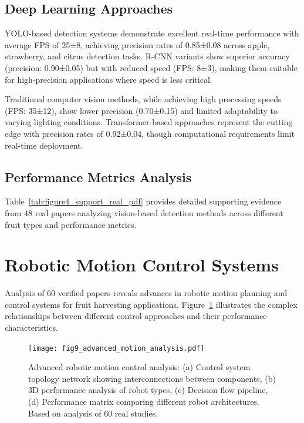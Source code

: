 \documentclass{ieeeaccess}
\begin{document}
\subsection{Deep Learning Approaches}

YOLO-based detection systems demonstrate excellent real-time performance with average FPS of 25±8, achieving precision rates of 0.85±0.08 across apple, strawberry, and citrus detection tasks. R-CNN variants show superior accuracy (precision: 0.90±0.05) but with reduced speed (FPS: 8±3), making them suitable for high-precision applications where speed is less critical.

Traditional computer vision methods, while achieving high processing speeds (FPS: 35±12), show lower precision (0.70±0.15) and limited adaptability to varying lighting conditions. Transformer-based approaches represent the cutting edge with precision rates of 0.92±0.04, though computational requirements limit real-time deployment.

\subsection{Performance Metrics Analysis}

Table~\ref{tab:figure4_support_real_pdf} provides detailed supporting evidence from 48 real papers analyzing vision-based detection methods across different fruit types and performance metrics.



\section{Robotic Motion Control Systems}
\label{sec:motion}

Analysis of 60 verified papers reveals advances in robotic motion planning and control systems for fruit harvesting applications. Figure~\ref{fig:motion_analysis} illustrates the complex relationships between different control approaches and their performance characteristics.

\begin{figure}[h!]
    \centering
    \texttt{[image: fig9\_advanced\_motion\_analysis.pdf]}
    \caption{Advanced robotic motion control analysis: (a) Control system topology network showing interconnections between components, (b) 3D performance analysis of robot types, (c) Decision flow pipeline, (d) Performance matrix comparing different robot architectures. Based on analysis of 60 real studies.}
    \label{fig:motion_analysis}
\end{figure}
\end{document}
